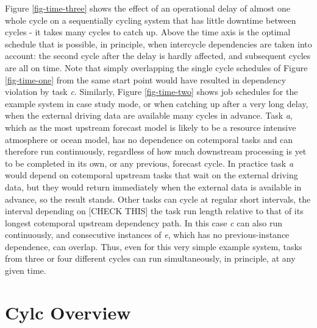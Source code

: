 \documentclass[11pt,a4paper]{article}
\begin{document}
Figure \ref{fig-time-three} shows the effect of an operational delay of
almost one whole cycle on a sequentially cycling system that has little
downtime between cycles - it takes many cycles to catch up. Above the
time axis is the optimal schedule that is possible, in principle, when
intercycle dependencies are taken into account: the second cycle after
the delay is hardly affected, and subsequent cycles are all on time.
Note that simply overlapping the single cycle schedules of Figure
\ref{fig-time-one} from the same start point would have resulted in
dependency violation by task {\em c}. Similarly, Figure
\ref{fig-time-two} shows job schedules for the example system in case
study mode, or when catching up after a very long delay, when the
external driving data are available many cycles in advance.  Task {\em
a}, which as the most upstream forecast model is likely to be a resource
intensive atmosphere or ocean model, has no dependence on cotemporal
tasks and can therefore run continuously, regardless of how much
downstream processing is yet to be completed in its own, or any
previous, forecast cycle. In practice task {\em a} would depend on
cotemporal upstream tasks that wait on the external driving data, but
they would return immediately when the external data is available in
advance, so the result stands. Other tasks can cycle at regular short
intervals, the interval depending on [CHECK THIS] the task run length
relative to that of its longest cotemporal upstream dependency path. In
this case {\em c} can also run continuously, and consecutive instances
of {\em e}, which has no previous-instance dependence, can overlap.
Thus, even for this very simple example system, tasks from three or four
different cycles can run simultaneously, in principle, at any given
time. 



\section{Cylc Overview}
\end{document}
